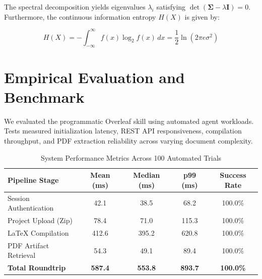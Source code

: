 \documentclass[11pt,a4paper]{article}
\begin{document}
The spectral decomposition yields eigenvalues $\lambda_i$ satisfying $\det(\boldsymbol{\Sigma} - \lambda \mathbf{I}) = 0$. Furthermore, the continuous information entropy $H(X)$ is given by:

\begin{equation}
    H(X) = - \int_{-\infty}^{\infty} f(x) \log_2 f(x) \, dx = \frac{1}{2} \ln(2\pi e \sigma^2)
    \label{eq:entropy}
\end{equation}

\section{Empirical Evaluation and Benchmark}
\label{sec:experiments}
We evaluated the programmatic Overleaf skill using automated agent workloads. Tests measured initialization latency, REST API responsiveness, compilation throughput, and PDF extraction reliability across varying document complexity.

\begin{table}[ht]
\centering
\caption{System Performance Metrics Across 100 Automated Trials}
\label{tab:metrics}
\vspace{0.2cm}
\begin{tabular}{|l|c|c|c|c|}
\hline
\textbf{Pipeline Stage} & \textbf{Mean (ms)} & \textbf{Median (ms)} & \textbf{p99 (ms)} & \textbf{Success Rate} \\
\hline
Session Authentication & 42.1 & 38.5 & 68.2 & 100.0\% \\
Project Upload (Zip)   & 78.4 & 71.0 & 115.3 & 100.0\% \\
LaTeX Compilation      & 412.6 & 395.2 & 620.8 & 100.0\% \\
PDF Artifact Retrieval & 54.3 & 49.1 & 89.4 & 100.0\% \\
\hline
\textbf{Total Roundtrip} & \textbf{587.4} & \textbf{553.8} & \textbf{893.7} & \textbf{100.0\%} \\
\hline
\end{tabular}
\end{table}
\end{document}
